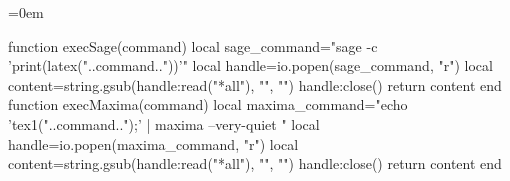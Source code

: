 \documentclass[a4paper]{ltjsarticle}
\begin{document}
\AMCcodeVspace=0em

\begin{luacode*}
function execSage(command)
  local sage_command="sage -c 'print(latex("..command.."))'"
  local handle=io.popen(sage_command, "r")
  local content=string.gsub(handle:read("*all"), "\n", "")
  handle:close()
  return content
end
function execMaxima(command)
  local maxima_command="echo 'tex1("..command..");' | maxima --very-quiet "
  local handle=io.popen(maxima_command, "r")
  local content=string.gsub(handle:read("*all"), "\n", "")
  handle:close()
  return content
end
\end{luacode*}

\end{document}
